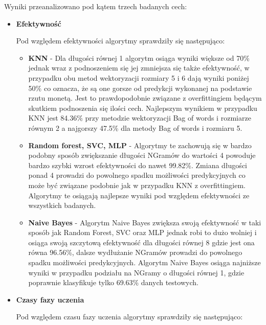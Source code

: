 Wyniki przeanalizowano pod kątem trzech badanych cech:

\begin{itemize}
    \item \textbf{Efektywność}
    
    Pod względem efektywności algorytmy sprawdziły się następująco:
    \begin{itemize}
        \item \textbf{KNN} -
        Dla długości równej 1 algorytm osiąga wyniki większe od 70\% jednak wraz 
        z podnoszeniem się jej zmniejsza się także efektywność, w przypadku obu metod 
        wektoryzacji rozmiary 5 i 6 dają wyniki poniżej 50\% co oznacza, że są one gorsze 
        od predykcji wykonanej na podstawie rzutu monetą. Jest to prawdopodobnie związane 
        z overfittingiem będącym skutkiem podnoszenia się ilości cech. Najlepszym wynikiem w 
        przypadku KNN jest 84.36\% przy metodzie wektoryzacji Bag of words i rozmiarze równym 2
        a najgorszy 47.5\%  dla metody Bag of words i rozmiaru 5.

        \item \textbf{Random forest, SVC, MLP} -        
        Algorytmy te zachowują się w bardzo podobny sposób zwiększanie długości NGramów 
        do wartości 4 powoduje bardzo szybki wzrost efektywności do nawet 99.82\%. Zmiana 
        długości ponad 4 prowadzi do powolnego spadku możliwości predykcyjnych co może być 
        związane podobnie jak w przypadku KNN z overfittingiem. Algorytmy te osiągają najlepsze 
        wyniki pod względem efektywności ze wszystkich badanych.
        \item \textbf{Naive Bayes} -
        Algorytm Naive Bayes zwiększa swoją efektywność w taki sposób jak Random Forest, SVC oraz MLP 
        jednak robi to dużo wolniej i osiąga swoją szczytową efektywność dla długości równej 8 gdzie 
        jest ona równa 96.56\%, dalsze wydłużanie NGramów prowadzi do powolnego spadku możliwości predykcyjnych.
        Algorytm Naive Bayes osiąga najniższe wyniki w przypadku podziału na NGramy o długości równej 1, gdzie 
        poprawnie klasyfikuje tylko 69.63\% danych testowych.
    \end{itemize}
    \item \textbf{Czasy fazy uczenia}
    
    Pod względem czasu fazy uczenia algorytmy sprawdziły się następująco:
    

\end{itemize}
